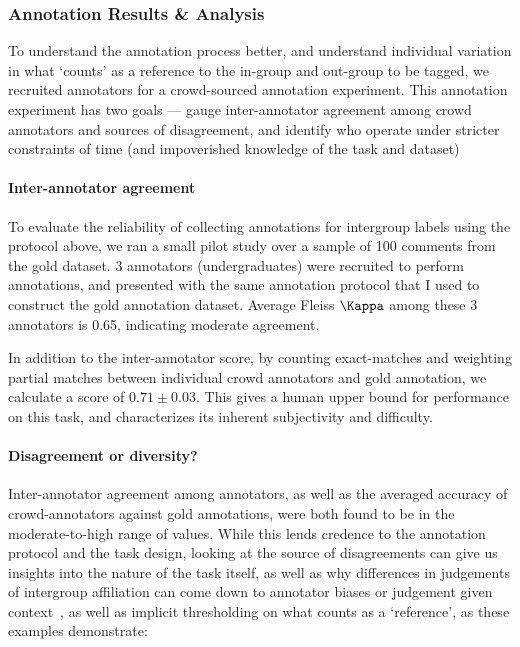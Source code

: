 

\subsubsection{Annotation Results \& Analysis}

To understand the annotation process better, and understand individual variation in what `counts' as a reference to the in-group and out-group to be tagged, we recruited annotators for a crowd-sourced annotation experiment. This annotation experiment has two goals --- gauge inter-annotator agreement among crowd annotators and sources of disagreement, and identify  who operate under stricter constraints of time (and impoverished knowledge of the task and dataset) 

\paragraph{Inter-annotator agreement} To evaluate the reliability of collecting annotations for intergroup labels using the protocol above, we ran a small pilot study over a sample of 100 comments from the gold dataset. 3 annotators (undergraduates) were recruited to perform annotations, and presented with the same annotation protocol that I used to construct the gold annotation dataset. Average Fleiss $\Kappa$ among these 3 annotators is  0.65, indicating moderate agreement.

In addition to the inter-annotator score, by counting exact-matches and weighting partial matches between individual crowd annotators and gold annotation, we calculate a score of $0.71 \pm 0.03$. This gives a human upper bound for performance on this task, and characterizes its inherent subjectivity and difficulty.

\paragraph{Disagreement or diversity?} Inter-annotator agreement among annotators, as well as the averaged accuracy of crowd-annotators against gold annotations, were both found to be in the moderate-to-high range of values. While this lends credence to the annotation protocol and the task design, looking at the source of disagreements can give us insights into the nature of the task itself, as well as why differences in judgements of intergroup affiliation can come down to annotator biases or judgement given context~\citep{atwell-etal-2022-role}, as well as implicit thresholding on what counts as a `reference', as these examples demonstrate:


